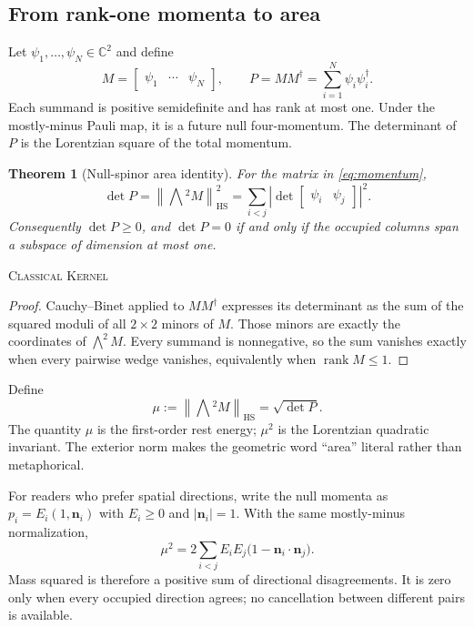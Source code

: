 \documentclass[11pt]{article}
\newcommand{\Kernel}{\textcolor{kernelcolor}{\textsc{Kernel}}}
\newcommand{\Classical}{\textcolor{classicalcolor}{\textsc{Classical}}}
\newcommand{\rank}{\operatorname{rank}}
\newcommand{\C}{\mathbb{C}}
\newcommand{\norm}[1]{\left\lVert #1\right\rVert}
\newtheorem{theorem}{Theorem}[section]
\begin{document}
\subsection{From rank-one momenta to area}

Let $\psi_1,\ldots,\psi_N\in\C^2$ and define
\begin{equation}\label{eq:momentum}
 M=\begin{bmatrix}\psi_1&\cdots&\psi_N\end{bmatrix},
 \qquad
 P=MM^\dagger=\sum_{i=1}^N\psi_i\psi_i^\dagger.
\end{equation}
Each summand is positive semidefinite and has rank at most one.  Under the
mostly-minus Pauli map, it is a future null four-momentum.  The determinant of
$P$ is the Lorentzian square of the total momentum.

\begin{theorem}[Null-spinor area identity]\label{thm:area}
For the matrix in \eqref{eq:momentum},
\begin{equation}\label{eq:area}
 \det P
 =\norm{\bigwedge{}^2 M}_{\mathrm{HS}}^2
 =\sum_{i<j}\left|\det\begin{bmatrix}\psi_i&\psi_j\end{bmatrix}\right|^2.
\end{equation}
Consequently $\det P\geq0$, and $\det P=0$ if and only if the occupied columns
span a subspace of dimension at most one.
\end{theorem}
\noindent\Classical{} \Kernel{}

\begin{proof}
Cauchy--Binet applied to $MM^\dagger$ expresses its determinant as the sum of
the squared moduli of all $2\times2$ minors of $M$.  Those minors are exactly
the coordinates of $\bigwedge^2M$.  Every summand is nonnegative, so the sum
vanishes exactly when every pairwise wedge vanishes, equivalently when
$\rank M\leq1$.
\end{proof}

Define
\begin{equation}\label{eq:mu}
 \mu:=\norm{\bigwedge{}^2M}_{\mathrm{HS}}=\sqrt{\det P}.
\end{equation}
The quantity $\mu$ is the first-order rest energy; $\mu^2$ is the Lorentzian
quadratic invariant.  The exterior norm makes the geometric word ``area''
literal rather than metaphorical.

For readers who prefer spatial directions, write the null momenta as
$p_i=E_i(1,\mathbf n_i)$ with $E_i\geq0$ and $|\mathbf n_i|=1$.  With the same
mostly-minus normalization,
\begin{equation}\label{eq:angular}
 \mu^2
 =2\sum_{i<j}E_iE_j\bigl(1-\mathbf n_i\mathbin{\cdot}\mathbf n_j\bigr).
\end{equation}
Mass squared is therefore a positive sum of directional disagreements.  It is
zero only when every occupied direction agrees; no cancellation between
different pairs is available.
\end{document}
